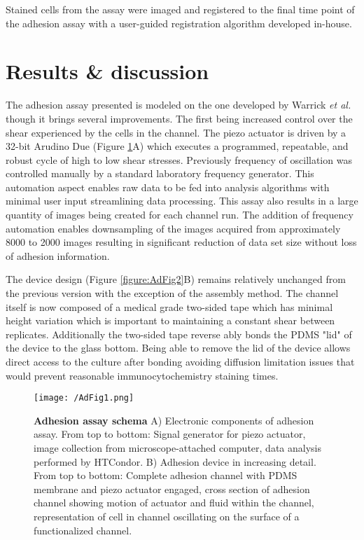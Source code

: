 Stained cells from the assay were imaged and registered to the final time point of the adhesion assay with a user-guided registration algorithm developed in-house. 

\section{Results \& discussion}

The adhesion assay presented is modeled on the one developed by Warrick \textit{et al.} though it brings several improvements. The first being increased control over the shear experienced by the cells in the channel. The piezo actuator is driven by a 32-bit Arudino Due (Figure \ref{figure:AdFig1}A) which executes a programmed, repeatable, and robust cycle of high to low shear stresses. Previously frequency of oscillation was controlled manually by a standard laboratory frequency generator. This automation aspect enables raw data to be fed into analysis algorithms with minimal user input streamlining data processing. This assay also results in a large quantity of images being created for each channel run. The addition of frequency automation enables downsampling of the images acquired from approximately 8000 to 2000 images resulting in significant reduction of data set size without loss of adhesion information.

The device design (Figure \ref{figure:AdFig2}B) remains relatively unchanged from the previous version with the exception of the assembly method. The channel itself is now composed of a medical grade two-sided tape which has minimal height variation which is important to maintaining a constant shear between replicates. Additionally the two-sided tape reverse ably bonds the PDMS "lid" of the device to the glass bottom. Being able to remove the lid of the device allows direct access to the culture after bonding avoiding diffusion limitation issues that would prevent reasonable immunocytochemistry staining times. 


\begin{figure}[ht] %
\centering
\texttt{[image: /AdFig1.png]}
\caption[\textbf{Adhesion assay schema}]{\textbf{Adhesion assay schema} A) Electronic components of adhesion assay. From top to bottom: Signal generator for piezo actuator, image collection from microscope-attached computer, data analysis performed by HTCondor. B) Adhesion device in increasing detail. From top to bottom: Complete adhesion channel with PDMS membrane and piezo actuator engaged, cross section of adhesion channel showing motion of actuator and fluid within the channel, representation of cell in channel oscillating on the surface of a functionalized channel.}
\label{figure:AdFig1}
\end{figure}

